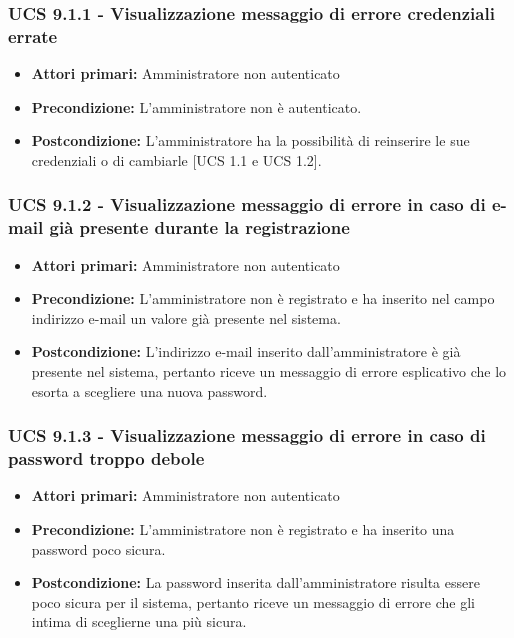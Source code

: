 \subsubsection{UCS 9.1.1 - Visualizzazione messaggio di errore credenziali errate}%
\begin{itemize}
\item \textbf{Attori primari:} Amministratore non autenticato
\item \textbf{Precondizione:} L'amministratore non è autenticato.
\item \textbf{Postcondizione:} L'amministratore ha la possibilità di reinserire le sue credenziali o di cambiarle [UCS 1.1 e UCS 1.2].
\end{itemize}

\subsubsection{UCS 9.1.2 - Visualizzazione messaggio di errore in caso di e-mail già presente durante la registrazione}%
\begin{itemize}
    \item \textbf{Attori primari:} Amministratore non autenticato
    \item \textbf{Precondizione:} L'amministratore non è registrato e ha inserito nel campo indirizzo e-mail un valore già presente nel sistema.
    \item \textbf{Postcondizione:} L'indirizzo e-mail inserito dall'amministratore è già presente nel sistema, pertanto riceve un messaggio di errore esplicativo che lo esorta a scegliere una nuova password.
\end{itemize}

\subsubsection{UCS 9.1.3 - Visualizzazione messaggio di errore in caso di password troppo debole}%
\begin{itemize}
\item \textbf{Attori primari:} Amministratore non autenticato
\item \textbf{Precondizione:} L'amministratore non è registrato e ha inserito una password poco sicura.
\item \textbf{Postcondizione:} La password inserita dall'amministratore risulta essere poco sicura per il sistema, pertanto riceve un messaggio di errore che gli intima di sceglierne una più sicura.
\end{itemize}


